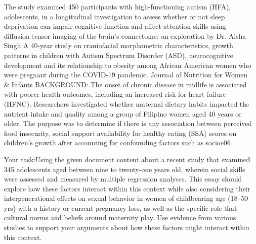\documentclass[12pt, a4paper]{article}
\begin{document}
{The study examined 450 participants with high-functioning autism (HFA), adolescents, in a longitudinal investigation to assess whether or not sleep deprivation can impair cognitive function and affect attention skills using diffusion tensor imaging of the brain's connectome: an exploration by Dr. Aisha Singh
A 40-year study on craniofacial morphometric characteristics, growth patterns in children with Autism Spectrum Disorder (ASD), neurocognitive development and its relationship to obesity among African American women who were pregnant during the COVID-19 pandemic. Journal of Nutrition for Women \& Infants
BACKGROUND: The onset of chronic disease in midlife is associated with poorer health outcomes, including an increased risk for heart failure (HFNC). Researchers investigated whether maternal dietary habits impacted the nutrient intake and quality among a group of Filipino women aged 40 years or older. The purpose was to determine if there is any association between perceived food insecurity, social support availability for healthy eating (SSA) scores on children's growth after accounting for confounding factors such as socioe06

 Your task:Using the given document content about a recent study that examined 345 adolescents aged between nine to twenty-one years old, wherein social skills were assessed and measured by multiple regression analyses. This essay should explore how these factors interact within this context while also considering their intergenerational effects on sexual behavior in women of childbearing age (18--50 yrs) with a history or current pregnancy loss, as well as the specific role that cultural norms and beliefs around maternity play. Use evidence from various studies to support your arguments about how these factors might interact within this context.

}
\end{document}
